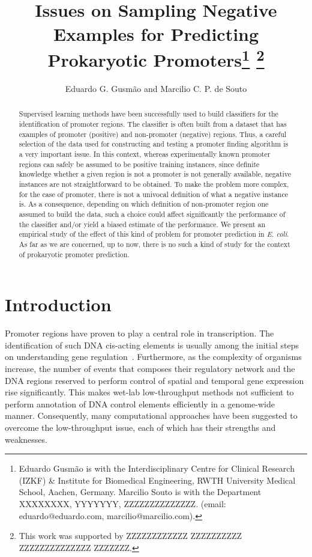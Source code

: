 \documentclass[conference]{IEEEtran}
\begin{document}
\title{\ \\ \LARGE\bf Issues on Sampling Negative Examples for Predicting Prokaryotic Promoters\thanks{Eduardo Gusm\~{a}o is with the Interdisciplinary Centre for Clinical Research (IZKF) \& Institute for Biomedical Engineering, RWTH University Medical School, Aachen, Germany. Marcilio Souto is with the Department XXXXXXXX, YYYYYYY, ZZZZZZZZZZZZZZ. (email: eduardo@eduardo.com, marcilio@marcilio.com).} \thanks{This work was supported by ZZZZZZZZZZZZ ZZZZZZZZZZ ZZZZZZZZZZZZZZ ZZZZZZZ.}}

\author{Eduardo G. Gusm\~{a}o and Marcilio C. P. de Souto}

\maketitle

\begin{abstract}
Supervised learning methods have been successfully used to build classifiers for the identification of promoter regions. The classifier is often built from a dataset that has examples of promoter (positive) and non-promoter (negative) regions. Thus, a careful selection of the data used for constructing and testing a promoter finding algorithm is a very important issue. In this context, whereas experimentally known promoter regions can safely be assumed to be positive training instances, since definite knowledge whether a given region is not a promoter is not generally available, negative instances are not straightforward to be obtained. To make the problem more complex, for the case of promoter, there is not a univocal definition of what a negative instance is. As a consequence, depending on which definition of non-promoter region one assumed to build the data, such a choice could affect significantly the performance of the classifier and/or yield a biased estimate of the performance. We present an empirical study of the effect of this kind of problem for promoter prediction in {\it E. coli}. As far as we are concerned, up to now, there is no such a kind of study for the context of prokaryotic promoter prediction.
\end{abstract}

\section{Introduction}

Promoter regions have proven to play a central role in transcription. The identification of such DNA cis-acting elements is usually among the initial steps on understanding gene regulation~\cite{maston2006}. Furthermore, as the complexity of organisms increase, the number of events that composes their regulatory network and the DNA regions reserved to perform control of spatial and temporal gene expression rise significantly. This makes wet-lab low-throughput methods not sufficient to perform annotation of DNA control elements efficiently in a genome-wide manner. Consequently, many computational approaches have been suggested to overcome the low-throughput issue, each of which has their strengths and weaknesses.
\end{document}
